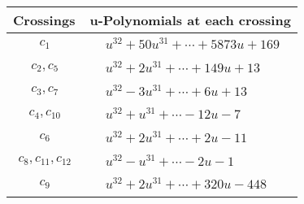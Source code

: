 \documentclass[1p]{elsarticle_modified}
\theoremstyle{definition}
\begin{document}
\begin{tabular}{m{50pt}|m{274pt}}
Crossings & \hspace{64pt}u-Polynomials at each crossing \\
\hline $$\begin{aligned}c_{1}\end{aligned}$$&$\begin{aligned}
&u^{32}+50 u^{31}+\cdots+5873 u+169
\end{aligned}$\\
\hline $$\begin{aligned}c_{2},c_{5}\end{aligned}$$&$\begin{aligned}
&u^{32}+2 u^{31}+\cdots+149 u+13
\end{aligned}$\\
\hline $$\begin{aligned}c_{3},c_{7}\end{aligned}$$&$\begin{aligned}
&u^{32}-3 u^{31}+\cdots+6 u+13
\end{aligned}$\\
\hline $$\begin{aligned}c_{4},c_{10}\end{aligned}$$&$\begin{aligned}
&u^{32}+u^{31}+\cdots-12 u-7
\end{aligned}$\\
\hline $$\begin{aligned}c_{6}\end{aligned}$$&$\begin{aligned}
&u^{32}+2 u^{31}+\cdots+2 u-11
\end{aligned}$\\
\hline $$\begin{aligned}c_{8},c_{11},c_{12}\end{aligned}$$&$\begin{aligned}
&u^{32}- u^{31}+\cdots-2 u-1
\end{aligned}$\\
\hline $$\begin{aligned}c_{9}\end{aligned}$$&$\begin{aligned}
&u^{32}+2 u^{31}+\cdots+320 u-448
\end{aligned}$\\
\hline
\end{tabular}\\~\\
\newpage\renewcommand{\arraystretch}{1}
\end{document}
